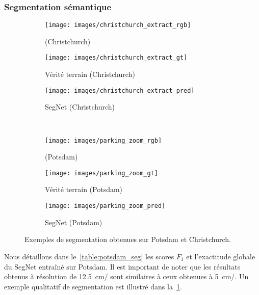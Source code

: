 \subsubsection{Segmentation sémantique}
\begin{figure}[t]
	\centering
	\begin{subfigure}{0.3\textwidth}
    	\texttt{[image: images/christchurch\_extract\_rgb]}
      \caption*{ (Christchurch)}
    \end{subfigure}
    \begin{subfigure}{0.3\textwidth}
    	\texttt{[image: images/christchurch\_extract\_gt]}
      \caption*{Vérité terrain (Christchurch)}
    \end{subfigure}
    \begin{subfigure}{0.3\textwidth}
    	\texttt{[image: images/christchurch\_extract\_pred]}
      \caption*{SegNet (Christchurch)}
    \end{subfigure}\\
    	\begin{subfigure}{0.3\textwidth}
    	\texttt{[image: images/parking\_zoom\_rgb]}
        \caption*{ (Potsdam)}
    \end{subfigure}
    \begin{subfigure}{0.3\textwidth}
    	\texttt{[image: images/parking\_zoom\_gt]}
        \caption*{Vérité terrain (Potsdam)}
    \end{subfigure}
    \begin{subfigure}{0.3\textwidth}
    	\texttt{[image: images/parking\_zoom\_pred]}
        \caption*{SegNet (Potsdam)}
    \end{subfigure}

    \caption[Exemples de segmentation obtenues sur Potsdam et Christchurch.]{Exemples de segmentation obtenues sur Potsdam et Christchurch.\\\isprslegende}
    \label{fig:segmentations}
\end{figure}

Nous détaillons dans le~\cref{table:potsdam_seg} les scores $F_1$ et l'exactitude globale du SegNet entraîné sur Potsdam. Il est important de noter que les résultats obtenus à résolution de \SI{12,5}{\centi\meter/\px} sont similaires à ceux obtenues à \SI{5}{\centi\meter/\px}. Un exemple qualitatif de segmentation est illustré dans la~\cref{fig:segmentations}.

